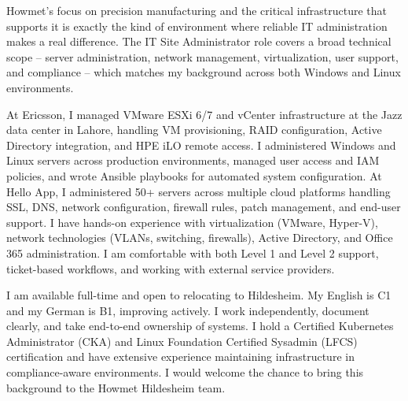 \documentclass[11pt, a4paper]{awesome-cv}
\begin{document}
\makecvheader[R]
\makelettertitle

\begin{cvletter}

Howmet's focus on precision manufacturing and the critical infrastructure that supports it is exactly the kind of environment where reliable IT administration makes a real difference. The IT Site Administrator role covers a broad technical scope -- server administration, network management, virtualization, user support, and compliance -- which matches my background across both Windows and Linux environments.

At Ericsson, I managed VMware ESXi 6/7 and vCenter infrastructure at the Jazz data center in Lahore, handling VM provisioning, RAID configuration, Active Directory integration, and HPE iLO remote access. I administered Windows and Linux servers across production environments, managed user access and IAM policies, and wrote Ansible playbooks for automated system configuration. At Hello App, I administered 50+ servers across multiple cloud platforms handling SSL, DNS, network configuration, firewall rules, patch management, and end-user support. I have hands-on experience with virtualization (VMware, Hyper-V), network technologies (VLANs, switching, firewalls), Active Directory, and Office 365 administration. I am comfortable with both Level 1 and Level 2 support, ticket-based workflows, and working with external service providers.

I am available full-time and open to relocating to Hildesheim. My English is C1 and my German is B1, improving actively. I work independently, document clearly, and take end-to-end ownership of systems. I hold a Certified Kubernetes Administrator (CKA) and Linux Foundation Certified Sysadmin (LFCS) certification and have extensive experience maintaining infrastructure in compliance-aware environments. I would welcome the chance to bring this background to the Howmet Hildesheim team.

\end{cvletter}

\makeletterclosing
\end{document}
